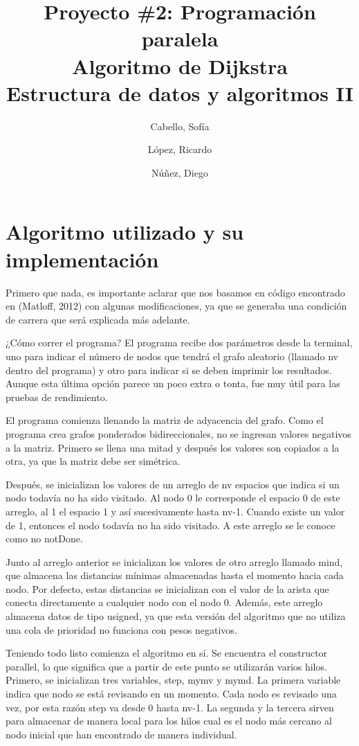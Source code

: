 \documentclass[11pt]{article}
\title{Proyecto \#2: Programación paralela\\
Algoritmo de Dijkstra\\
\large Estructura de datos y algoritmos II}
\author{Cabello, Sofía
\and López, Ricardo
\and Núñez, Diego}
\begin{document}
\maketitle{}

\section{Algoritmo utilizado y su implementación }


Primero que nada, es importante aclarar que nos basamos en código encontrado en (Matloff, 2012) con algunas modificaciones, ya que se generaba una condición de carrera que será explicada más adelante.
\par 
¿Cómo correr el programa? El programa recibe dos parámetros desde la terminal, uno para indicar el número de nodos que tendrá el grafo aleatorio (llamado nv dentro del programa) y otro para indicar si se deben imprimir los resultados. Aunque esta última opción parece un poco extra o tonta, fue muy útil para las pruebas de rendimiento.
\par 
El programa comienza llenando la matriz de adyacencia del grafo. Como el programa crea grafos ponderados bidireccionales, no se ingresan valores negativos a la matriz. Primero se llena una mitad y después los valores son copiados a la otra, ya que la matriz debe ser simétrica.
\par 
Después, se inicializan los valores de un arreglo de nv espacios que indica si un nodo todavía no ha sido visitado. Al nodo 0 le corresponde el espacio 0 de este arreglo, al 1 el espacio 1 y así sucesivamente hasta nv-1. Cuando existe un valor de 1, entonces el nodo todavía no ha sido visitado. A este arreglo se le conoce como no notDone.
\par
Junto al arreglo anterior se inicializan los valores de otro arreglo llamado mind, que almacena las distancias mínimas almacenadas hasta el momento hacia cada nodo. Por defecto, estas distancias se inicializan con el valor de la arista que conecta directamente a cualquier nodo con el nodo 0. Además, este arreglo almacena datos de tipo usigned, ya que esta versión del algoritmo que no utiliza una cola de prioridad no funciona con pesos negativos. 
\par
Teniendo todo listo comienza el algoritmo en sí. Se encuentra el constructor parallel, lo que significa que a partir de este punto se utilizarán varios hilos. Primero, se inicializan tres variables, step, mymv y mymd. La primera variable indica que nodo se está revisando en un momento. Cada nodo es revisado una vez, por esta razón step va desde 0 hasta nv-1. La segunda y la tercera sirven para almacenar de manera local para los hilos cual es el nodo más cercano al nodo inicial que han encontrado de manera individual. 
\end{document}

